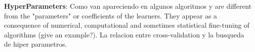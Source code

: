 \textbf{HyperParameters}:
Como van apareciendo en algunos algoritmos y are different from the "parameters" or coefficients of the learners. They appear as a consequence of numerical, computational and sometimes statistical fine-tuning of algorithms (give an example?). 
La relacion entre cross-validation y la busqueda de hiper parametros. 

\textit{}

\textit{}


